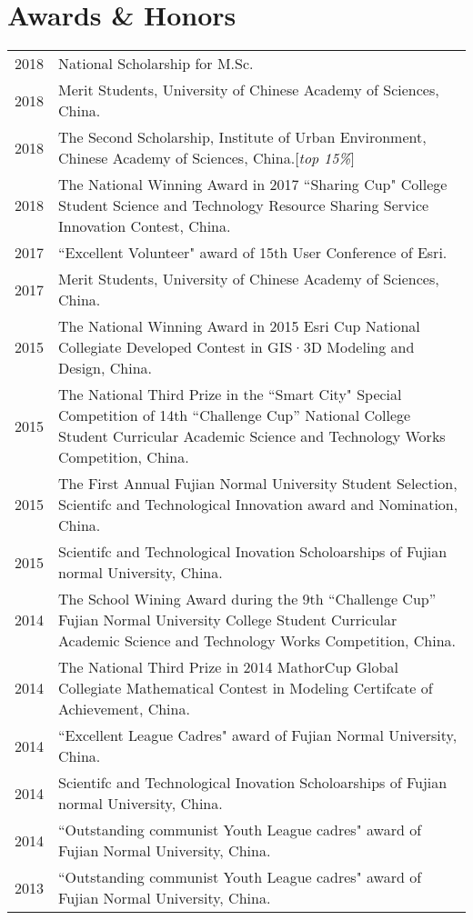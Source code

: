 \section*{Awards \& Honors}

\begin{tabular}{p{} p{}}
2018 & National Scholarship for M.Sc.\\
2018 & Merit Students, University of Chinese Academy of Sciences, China.\\
2018 & The Second Scholarship, Institute of Urban Environment, Chinese Academy of Sciences, China.[\textit{top 15\%}] \\
2018 & The National Winning Award in 2017 ``Sharing Cup" College Student Science and Technology Resource Sharing Service Innovation Contest, China.\\
2017 & ``Excellent Volunteer" award of 15th User Conference of Esri. \\
2017 & Merit Students, University of Chinese Academy of Sciences, China. \\
2015 & The National Winning Award in 2015 Esri Cup National Collegiate Developed Contest in GIS·3D Modeling and Design, China.\\
2015 & The National Third Prize in the ``Smart City" Special Competition of 14th “Challenge Cup” National College Student Curricular Academic Science and Technology Works Competition, China.\\
2015 & The First Annual Fujian Normal University Student Selection, Scientifc and Technological Innovation award and Nomination, China.\\
2015 & Scientifc and Technological Inovation Scholoarships of Fujian normal University, China.\\
2014 & The School Wining Award during the 9th “Challenge Cup” Fujian Normal University College Student Curricular Academic Science and Technology Works Competition, China.\\
2014 & The National Third Prize in 2014 MathorCup Global Collegiate Mathematical Contest in Modeling Certifcate of Achievement, China.\\
2014 & ``Excellent League Cadres" award of Fujian Normal University, China.\\
2014 & Scientifc and Technological Inovation Scholoarships of Fujian normal University, China.\\
2014 & ``Outstanding communist Youth League cadres" award of Fujian Normal University, China.\\
2013 & ``Outstanding communist Youth League cadres" award of Fujian Normal University, China.\\
\end{tabular}
